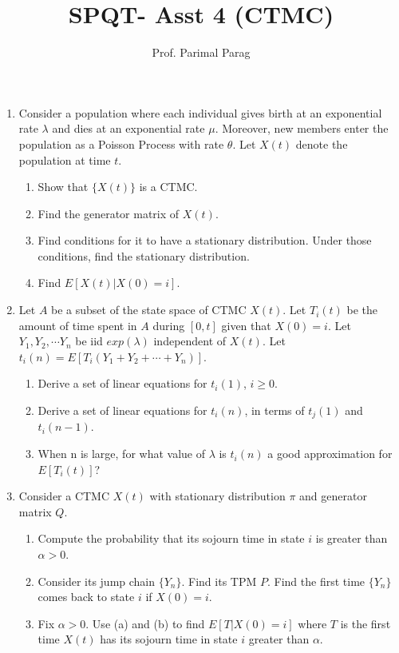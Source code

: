 \documentclass[a4paper,10pt]{article}
\title{SPQT- Asst 4 (CTMC)}
\author{Prof. Parimal Parag}
\begin{document}
\maketitle
\begin{enumerate}
	\item Consider a population where each individual gives birth at an exponential rate $\lambda$ and dies at an exponential rate $\mu$. Moreover, new members enter the population as a Poisson Process with rate $\theta$. Let $X(t)$ denote the population at time $t$. 
	\begin{enumerate}
		\item Show that $\{X(t)\}$ is a CTMC.
		\item Find the generator matrix of $X(t)$.
		\item Find conditions for it to have a stationary distribution. Under those conditions, find the stationary distribution.
		\item Find $E[X(t)|X(0)=i]$.
	\end{enumerate}
	
	\item Let $A$ be a subset of the state space of CTMC $X(t)$. Let $T_i(t)$ be the amount of time spent in $A$ during $[0,t]$ given that $X(0) = i$. Let $Y_1,Y_2,\cdots Y_n$ be iid $exp(\lambda)$ independent of $X(t)$. Let $t_i(n) = E[T_i(Y_1+Y_2+ \cdots + Y_n)]$.
	\begin{enumerate}
		\item Derive a set of linear equations for $t_i(1)$, $i\geq 0$.
		\item Derive a set of linear equations for $t_i(n)$, in terms of $t_j(1)$ and $t_i(n-1)$.
		\item When n is large, for what value of $\lambda$ is $t_i(n)$ a good approximation for $E[T_i(t)]$?
	\end{enumerate}
	
	\item Consider a CTMC $X(t)$ with stationary distribution $\pi$ and generator matrix $Q$. 
	\begin{enumerate}
		\item Compute the probability that its sojourn time in state $i$ is greater than $\alpha > 0$.
		\item Consider its jump chain $\{Y_n\}$. Find its TPM $P$. Find the first time $\{Y_n\}$ comes back to state $i$ if $X(0) = i$.
		\item Fix $\alpha > 0$. Use (a) and (b) to find $E[T|X(0) = i]$ where $T$ is the first time $X(t)$ has its sojourn time in state $i$ greater than $\alpha$.
	\end{enumerate}
	

\end{enumerate}
\end{document}
